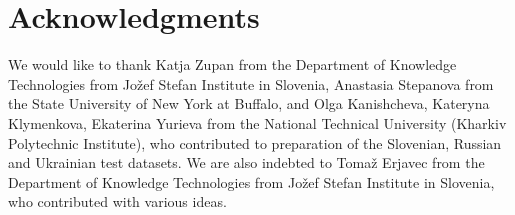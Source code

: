 \documentclass[11pt]{article}
\begin{document}
\section*{Acknowledgments}


We would like to thank Katja Zupan from the Department of Knowledge Technologies from
Jožef Stefan Institute in Slovenia, Anastasia Stepanova from the State University of New York at Buffalo, 
and Olga Kanishcheva, Kateryna Klymenkova, Ekaterina Yurieva from the National Technical University 
(Kharkiv Polytechnic Institute), who contributed to preparation of the Slovenian, Russian and Ukrainian test 
datasets. We are also indebted to Tomaž Erjavec from the Department of Knowledge Technologies from Jožef Stefan 
Institute in Slovenia, who contributed with various ideas.






\end{document}
